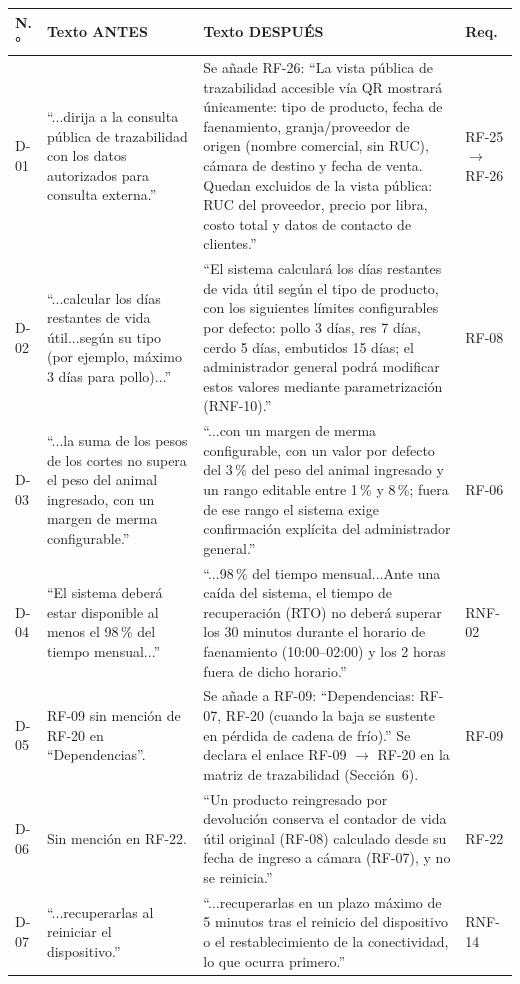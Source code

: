 \documentclass[11pt,a4paper]{article}
\begin{document}
\begin{longtable}{|p{0.8cm}|p{5.4cm}|p{5.4cm}|p{1.4cm}|}
\hline
\textbf{N.°} & \textbf{Texto ANTES} & \textbf{Texto DESPUÉS} & \textbf{Req.} \\
\hline
\endhead
D-01 & “...dirija a la consulta pública de trazabilidad con los datos autorizados para consulta externa.” & Se añade RF-26: “La vista pública de trazabilidad accesible vía QR mostrará únicamente: tipo de producto, fecha de faenamiento, granja/proveedor de origen (nombre comercial, sin RUC), cámara de destino y fecha de venta. Quedan excluidos de la vista pública: RUC del proveedor, precio por libra, costo total y datos de contacto de clientes.” & RF-25 $\to$ RF-26 \\
\hline
D-02 & “...calcular los días restantes de vida útil...según su tipo (por ejemplo, máximo 3 días para pollo)...” & “El sistema calculará los días restantes de vida útil según el tipo de producto, con los siguientes límites configurables por defecto: pollo 3 días, res 7 días, cerdo 5 días, embutidos 15 días; el administrador general podrá modificar estos valores mediante parametrización (RNF-10).” & RF-08 \\
\hline
D-03 & “...la suma de los pesos de los cortes no supera el peso del animal ingresado, con un margen de merma configurable.” & “...con un margen de merma configurable, con un valor por defecto del 3\,\% del peso del animal ingresado y un rango editable entre 1\,\% y 8\,\%; fuera de ese rango el sistema exige confirmación explícita del administrador general.” & RF-06 \\
\hline
D-04 & “El sistema deberá estar disponible al menos el 98\,\% del tiempo mensual...” & “...98\,\% del tiempo mensual...Ante una caída del sistema, el tiempo de recuperación (RTO) no deberá superar los 30 minutos durante el horario de faenamiento (10:00--02:00) y los 2 horas fuera de dicho horario.” & RNF-02 \\
\hline
D-05 & RF-09 sin mención de RF-20 en “Dependencias”. & Se añade a RF-09: “Dependencias: RF-07, RF-20 (cuando la baja se sustente en pérdida de cadena de frío).” Se declara el enlace RF-09 $\to$ RF-20 en la matriz de trazabilidad (Sección~6). & RF-09 \\
\hline
D-06 & Sin mención en RF-22. & “Un producto reingresado por devolución conserva el contador de vida útil original (RF-08) calculado desde su fecha de ingreso a cámara (RF-07), y no se reinicia.” & RF-22 \\
\hline
D-07 & “...recuperarlas al reiniciar el dispositivo.” & “...recuperarlas en un plazo máximo de 5 minutos tras el reinicio del dispositivo o el restablecimiento de la conectividad, lo que ocurra primero.” & RNF-14 \\

\end{longtable}
\end{document}
